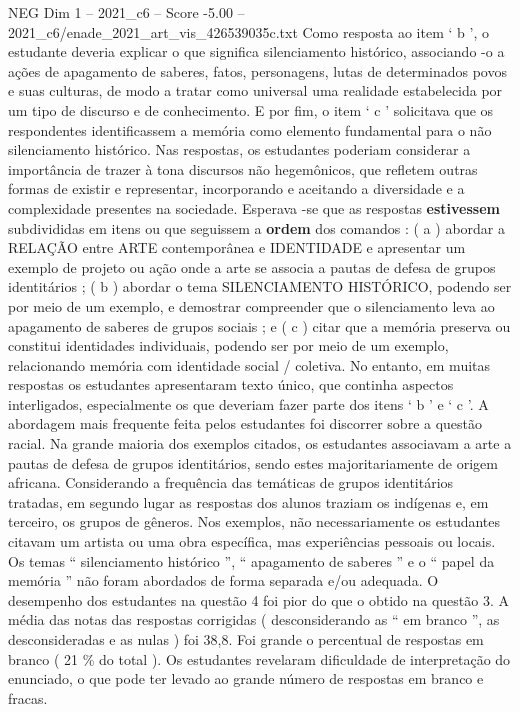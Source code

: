 \begin{textsample}{NEG Dim 1 – 2021\_c6 – Score -5.00 – 2021\_c6/enade\_2021\_art\_vis\_426539035c.txt}
Como resposta ao item ‘ b ’, o estudante deveria explicar o que significa silenciamento histórico, associando -o a ações de apagamento de saberes, fatos, personagens, lutas de determinados povos e suas culturas, de modo a tratar como universal uma realidade estabelecida por um tipo de discurso e de conhecimento.
E por fim, o item ‘ c ’ solicitava que os respondentes identificassem a memória como elemento fundamental para o não silenciamento histórico.
Nas respostas, os estudantes poderiam considerar a importância de trazer à tona discursos não hegemônicos, que refletem outras formas de existir e representar, incorporando e aceitando a diversidade e a complexidade presentes na sociedade.
Esperava -se que as respostas \textbf{estivessem} subdivididas em itens ou que seguissem a \textbf{ordem} dos comandos : ( a ) abordar a RELAÇÃO entre ARTE contemporânea e IDENTIDADE e apresentar um exemplo de projeto ou ação onde a arte se associa a pautas de defesa de grupos identitários ; ( b ) abordar o tema SILENCIAMENTO HISTÓRICO, podendo ser por meio de um exemplo, e demostrar compreender que o silenciamento leva ao apagamento de saberes de grupos sociais ; e ( c ) citar que a memória preserva ou constitui identidades individuais, podendo ser por meio de um exemplo, relacionando memória com identidade social / coletiva.
No entanto, em muitas respostas os estudantes apresentaram texto único, que continha aspectos interligados, especialmente os que deveriam fazer parte dos itens ‘ b ’ e ‘ c ’.
A abordagem mais frequente feita pelos estudantes foi discorrer sobre a questão racial.
Na grande maioria dos exemplos citados, os estudantes associavam a arte a pautas de defesa de grupos identitários, sendo estes majoritariamente de origem africana.
Considerando a frequência das temáticas de grupos identitários tratadas, em segundo lugar as respostas dos alunos traziam os indígenas e, em terceiro, os grupos de gêneros.
Nos exemplos, não necessariamente os estudantes citavam um artista ou uma obra específica, mas experiências pessoais ou locais.
Os temas “ silenciamento histórico ”, “ apagamento de saberes ” e o “ papel da memória ” não foram abordados de forma separada e/ou adequada.
O desempenho dos estudantes na questão 4 foi pior do que o obtido na questão 3.
A média das notas das respostas corrigidas ( desconsiderando as “ em branco ”, as desconsideradas e as nulas ) foi 38,8.
Foi grande o percentual de respostas em branco ( 21 \% do total ).
Os estudantes revelaram dificuldade de interpretação do enunciado, o que pode ter levado ao grande número de respostas em branco e fracas.

\end{textsample}
